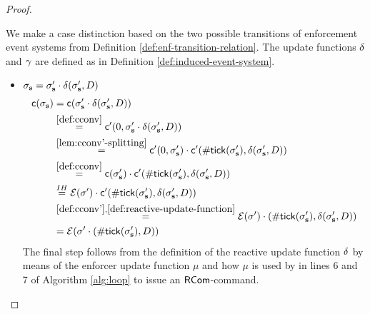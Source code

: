 \begin{proof}
\begin{itemize}
        We make a case distinction based on the two possible transitions
        of enforcement event systems from Definition
        \ref{def:enf-transition-relation}.
        The update functions $\delta$ and $\gamma$ are defined
        as in Definition \ref{def:induced-event-system}.
        \begin{itemize}
            \item
            $\sigma_{\mathbf{s}} = \sigma_{\mathbf{s}}' \cdot \delta(\sigma_{\mathbf{s}}', D)$
            \begin{align*}
                \mathsf{c}(\sigma_{\mathbf{s}})
                &= \mathsf{c}(\sigma_{\mathbf{s}}' \cdot \delta(\sigma_{\mathbf{s}}', D)) \\
                &\stackrel{\ref{def:cconv}}{=}
                    \mathsf{c}'(0, \sigma_{\mathbf{s}}' \cdot \delta(\sigma_{\mathbf{s}}', D)) \\
                &\stackrel{\ref{lem:cconv'-splitting}}{=}
                    \mathsf{c}'(0, \sigma_{\mathbf{s}}') \cdot
                    \mathsf{c}'(\mathsf{\#tick}(\sigma_{\mathbf{s}}'), \delta(\sigma_{\mathbf{s}}', D)) \\
                &\stackrel{\ref{def:cconv}}{=}
                    \mathsf{c}(\sigma_{\mathbf{s}}') \cdot
                    \mathsf{c}'(\mathsf{\#tick}(\sigma_{\mathbf{s}}'), \delta(\sigma_{\mathbf{s}}', D)) \\
                &\stackrel{IH}{=}
                    \mathcal{E}(\sigma') \cdot
                    \mathsf{c}'(\mathsf{\#tick}(\sigma_{\mathbf{s}}'), \delta(\sigma_{\mathbf{s}}', D)) \\
                &\stackrel{\ref{def:cconv'}, \ref{def:reactive-update-function}}{=}
                    \mathcal{E}(\sigma') \cdot
                    (\mathsf{\#tick}(\sigma_{\mathbf{s}}'), \delta(\sigma_{\mathbf{s}}', D)) \\
                &=
                    \mathcal{E}(\sigma' \cdot
                    (\mathsf{\#tick}(\sigma_{\mathbf{s}}'), D))
            \end{align*}
            The final step follows from the definition of the
            reactive update function $\delta$ by means of the enforcer
            update function $\mu$ and how $\mu$ is used by
            in lines 6 and 7 of Algorithm \ref{alg:loop}
            to issue an $\mathsf{RCom}$-command.


\end{itemize}
\end{itemize}
\end{proof}
